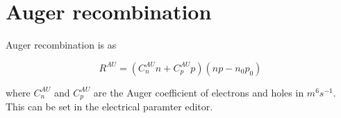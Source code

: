 \section{Auger recombination}
\label{sec:auger}
Auger recombination is as

\begin{equation}
R^{AU}=(C^{AU}_{n}n+C^{AU}_{p}p)(np-n_{0}p_{0})
\end{equation}

where $C^{AU}_{n}$ and $C^{AU}_{p}$ are the Auger coefficient of electrons and holes in $m^6 s^{-1}$. This can be set in the electrical paramter editor.

